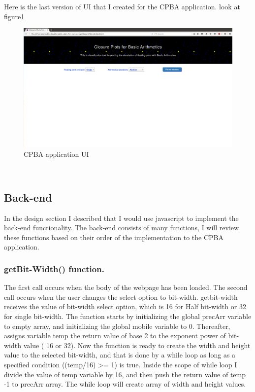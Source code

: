 \documentclass[11pt]{article}
\begin{document}
Here is the last version of UI that I created for the CPBA application. look at figure\ref{UI}
\begin{figure}[h]
    \centering
    \includegraphics[width=1\textwidth]{layout}
    \caption{CPBA application UI}
    \label{UI}
\end{figure}\\
\subsection{Back-end}
In the design section I described that I would use javascript to implement the back-end functionality. The back-end consists of many functions, I will review these functions based on their order of the implementation to the CPBA application.
\subsubsection{getBit-Width() function.}
The first call occurs when the body of the webpage has been loaded. The second call occurs when the user changes the select option to bit-width. getbit-width receives the value of bit-width select option, which is 16 for Half bit-width or 32 for single bit-width. The function starts by initializing the global precArr variable to empty array, and initializing the global mobile variable to 0. Thereafter, assigns variable temp the return value of base 2 to the exponent power of bit-width value ( 16 or 32).
Now the function is ready to create the width and height value to the selected bit-width, and that is done by a while loop as long as a specified condition ((temp/16) >= 1) is true. Inside the scope of while loop I divide the value of temp variable by 16, and then push the return value of temp -1 to precArr array. The while loop will create array of width and height values.\\
\end{document}
